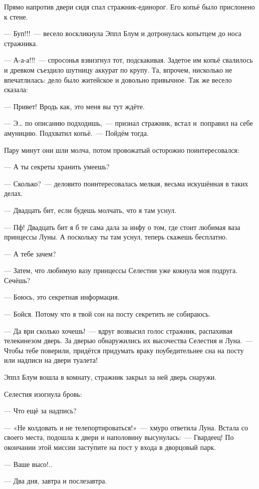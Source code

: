 \documentclass[fontsize=11pt,a5paper,titlepage=firstcover]{scrbook}
\begin{document}
Прямо напротив двери сидя спал стражник-единорог. Его копьё было прислонено к стене.

--- Буп!!!~--- весело воскликнула Эппл Блум и дотронулась копытцем до носа стражника.

--- А-а-а!!!~--- спросонья взвизгнул тот, подскакивая. Задетое им копьё свалилось и древком съездило шутницу аккурат по крупу. Та, впрочем, нисколько не впечатлилась: дело было житейское и довольно привычное. Так же весело сказала:

--- Привет! Вродь как, это меня вы тут ждёте.

--- Э{\ldots} по описанию подходишь,~--- признал стражник, встал и~поправил на себе амуницию. Подхватил копьё.~--- Пойдём тогда.

Пару минут они шли молча, потом провожатый осторожно поинтересовался:

--- А ты секреты хранить умеешь?

--- Сколько?~--- деловито поинтересовалась мелкая, весьма искушённая в таких делах.

--- Двадцать бит, если будешь молчать, что я там уснул.

--- Пф! Двадцать бит я б те сама дала за инфу о том, где стоит любимая ваза принцессы Луны. А поскольку ты там уснул, теперь скажешь бесплатно.

--- А тебе зачем?

--- Затем, что любимую вазу принцессы Селестии уже кокнула моя подруга. Сечёшь?

--- Боюсь, это секретная информация.

--- Бойся. Потому что я твой сон на посту секретить не собираюсь.

--- Да ври сколько хочешь!~--- вдруг возвысил голос стражник, распахивая телекинезом дверь. За дверью обнаружились их высочества Селестия и Луна.~--- Чтобы тебе поверили, придётся придумать враку поубедительнее сна на посту или надписи на двери туалета!

Эппл Блум вошла в комнату, стражник закрыл за ней дверь снаружи.

Селестия изогнула бровь:

--- Что ещё за надпись?

--- «Не колдовать и не телепортироваться!»~--- хмуро ответила Луна. Встала со своего места, подошла к двери и наполовину высунулась:~--- Гвардеец! По окончании этой миссии засту́пите на пост у входа в дворцовый парк.

--- Ваше высо!..

--- Два дня, завтра и послезавтра.
\end{document}
